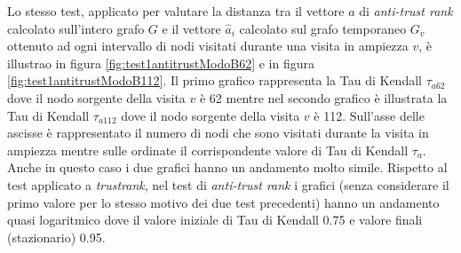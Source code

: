 Lo stesso test, applicato per valutare la distanza tra il vettore \(a\) di \textit{anti-trust rank} calcolato sull'intero grafo \(G\) e il vettore \(\hat{a}_i\) calcolato sul grafo temporaneo \(G_v\) ottenuto ad ogni intervallo di nodi visitati durante una visita in ampiezza \(v\), è illustrao in figura \ref{fig:test1antitrustModoB62} e in figura \ref{fig:test1antitrustModoB112}. Il primo grafico rappresenta la Tau di Kendall \(\tau_{a62}\)  dove il nodo sorgente della visita \(v\) è 62 mentre nel secondo grafico è illustrata la Tau di Kendall \(\tau_{a112}\) dove il nodo sorgente  della visita \(v\) è 112.  Sull'asse delle ascisse è rappresentato il numero di nodi che sono visitati durante la visita in ampiezza mentre sulle ordinate il corrispondente valore di Tau di Kendall \(\tau_a\). Anche in questo caso i due grafici hanno un andamento molto simile. Rispetto al test applicato a \textit{trustrank}, nel test di \textit{anti-trust rank}  i grafici (senza considerare il 
primo valore per lo stesso motivo dei due test precedenti) hanno un andamento quasi logaritmico dove il valore iniziale di Tau di Kendall 0.75 e  valore finali (stazionario) 0.95.

